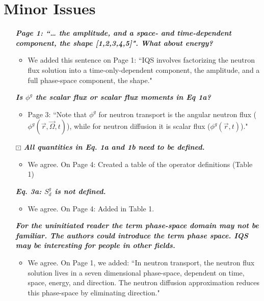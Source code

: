 \documentclass{elsarticle}
\newcommand{\working}{$\boxdot$}
\newcommand{\done}{\checkmark}
\newcommand{\easy}[1]{\textbf{\textit{#1}}}
\begin{document}
\section*{Minor Issues}

\begin{itemize}

\item[\done] \easy{ Page 1: ``… the amplitude, and a space- and time-dependent component, the shape [1,2,3,4,5]". What about energy? }
\begin{itemize}
\item We added this sentence on Page 1: ``IQS involves factorizing the neutron flux solution into a time-only-dependent component, the amplitude, and a full phase-space component, the shape."
\end{itemize}

\item[\done] \easy{ Is $\phi^g$ the scalar flux or scalar flux moments in Eq 1a? }
\begin{itemize}
\item Page 3: ``Note that $\phi^g$ for neutron transport is the angular neutron flux ($\phi^g(\vec r, \vec\Omega, t)$), while for neutron diffusion it is scalar flux ($\phi^g(\vec r, t)$)."
\end{itemize}

\item[\working] \easy{ All quantities in Eq. 1a and 1b need to be defined. }
\begin{itemize}
\item We agree. On Page 4: Created a table of the operator definitions (Table 1)
\end{itemize}

\item[\done] \easy{ Eq. 3a: $S_d^g$ is not defined. }
\begin{itemize}
\item We agree. On Page 4: Added in Table 1.
\end{itemize}

\item[\done] \easy{ For the uninitiated reader the term phase-space domain may not be familiar. The authors could introduce the term phase space. IQS may be interesting for people in other fields. }
\begin{itemize}
\item We agree. On Page 1, we added: ``In neutron transport, the neutron flux solution lives in a seven dimensional phase-space, dependent on time, space, energy, and direction. The neutron diffusion approximation reduces this phase-space by eliminating direction."
\end{itemize}


\end{itemize}
\end{document}
